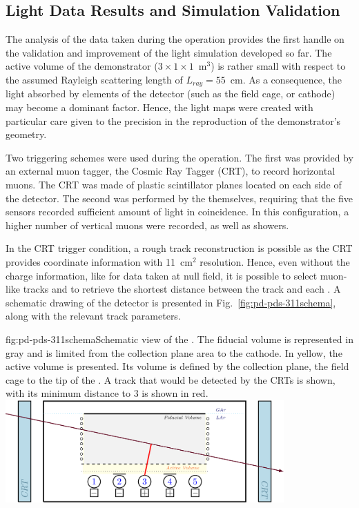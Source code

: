 
\subsection{ Light Data Results and Simulation Validation}


The analysis of the data taken during the  operation provides the first handle on the validation and improvement of the light simulation developed so far. 
The active volume of the demonstrator ($3\times1\times1$~m$^3$) is rather small with respect to the assumed Rayleigh scattering length of $L_{ray} = 55$~cm. 
As a consequence, the light absorbed by elements of the detector (such as the field cage,  or cathode) may become a dominant factor.
Hence, the light maps were created with particular care given to the precision in the reproduction of the demonstrator's geometry.

Two triggering schemes were used during the  operation.
The first was provided by an external muon tagger, the Cosmic Ray Tagger (CRT), to record horizontal muons. The CRT was made of plastic scintillator planes located on each side of the detector.
The second was performed by the  themselves, requiring that the five sensors recorded sufficient amount of light in coincidence. In this configuration, a higher number of vertical muons were recorded, as well as showers.

In the CRT trigger condition, a rough track reconstruction is possible as the CRT provides coordinate information with 11~cm$^2$ resolution. Hence, even without the charge information, like for data taken at null field, it is possible to select muon-like tracks and to retrieve the shortest distance between the track and each . A schematic drawing of the  detector is presented in Fig.~\ref{fig:pd-pds-311schema}, along with the relevant track parameters.

\begin{dunefigure}{fig:pd-pds-311schema}{Schematic view of the . 
The fiducial volume is represented in gray and is limited from the collection plane area to the cathode. In yellow, the active volume is presented. Its volume is defined by the collection plane, the field cage to the tip of the . A track that would be detected by the CRTs is shown, with its minimum distance to  3 is shown in red.}
\includegraphics[width=0.8\textwidth]{graphics/dppd_7_2}
\end{dunefigure}

